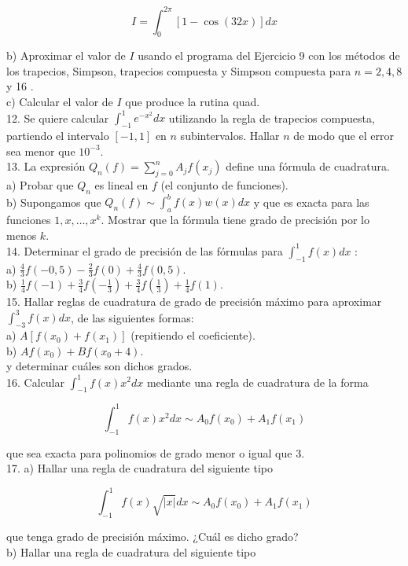 \documentclass[10pt]{book}
\begin{document}
$$
I=\int_{0}^{2 \pi}[1-\cos (32 x)] d x
$$

b) Aproximar el valor de $I$ usando el programa del Ejercicio 9 con los métodos de los trapecios, Simpson, trapecios compuesta y Simpson compuesta para $n=2,4,8$ y 16 .\\
c) Calcular el valor de $I$ que produce la rutina quad.\\
12. Se quiere calcular $\int_{-1}^{1} e^{-x^{2}} d x$ utilizando la regla de trapecios compuesta, partiendo el intervalo $[-1,1]$ en $n$ subintervalos. Hallar $n$ de modo que el error sea menor que $10^{-3}$.\\
13. La expresión $Q_{n}(f)=\sum_{j=0}^{n} A_{j} f\left(x_{j}\right)$ define una fórmula de cuadratura.\\
a) Probar que $Q_{n}$ es lineal en $f$ (el conjunto de funciones).\\
b) Supongamos que $Q_{n}(f) \sim \int_{a}^{b} f(x) w(x) d x$ y que es exacta para las funciones $1, x, \ldots, x^{k}$. Mostrar que la fórmula tiene grado de precisión por lo menos $k$.\\
14. Determinar el grado de precisión de las fórmulas para $\int_{-1}^{1} f(x) d x$ :\\
a) $\frac{4}{3} f(-0,5)-\frac{2}{3} f(0)+\frac{4}{3} f(0,5)$.\\
b) $\frac{1}{4} f(-1)+\frac{3}{4} f\left(-\frac{1}{3}\right)+\frac{3}{4} f\left(\frac{1}{3}\right)+\frac{1}{4} f(1)$.\\
15. Hallar reglas de cuadratura de grado de precisión máximo para aproximar $\int_{-3}^{3} f(x) d x$, de las siguientes formas:\\
a) $A\left[f\left(x_{0}\right)+f\left(x_{1}\right)\right]$ (repitiendo el coeficiente).\\
b) $A f\left(x_{0}\right)+B f\left(x_{0}+4\right)$.\\
y determinar cuáles son dichos grados.\\
16. Calcular $\int_{-1}^{1} f(x) x^{2} d x$ mediante una regla de cuadratura de la forma

$$
\int_{-1}^{1} f(x) x^{2} d x \sim A_{0} f\left(x_{0}\right)+A_{1} f\left(x_{1}\right)
$$

que sea exacta para polinomios de grado menor o igual que 3.\\
17. a) Hallar una regla de cuadratura del siguiente tipo

$$
\int_{-1}^{1} f(x) \sqrt{|x|} d x \sim A_{0} f\left(x_{0}\right)+A_{1} f\left(x_{1}\right)
$$

que tenga grado de precisión máximo. ¿Cuál es dicho grado?\\
b) Hallar una regla de cuadratura del siguiente tipo
\end{document}

